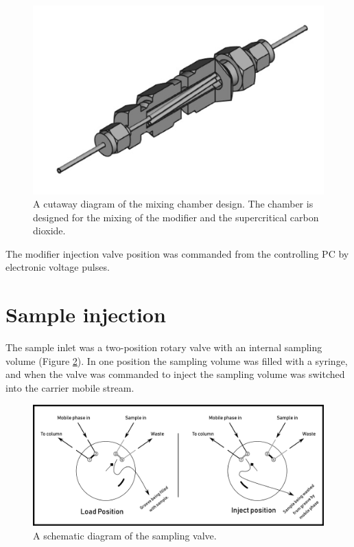 \begin{figure}
\centering
\includegraphics[width=\textwidth]{Figures/MixingChamber.png}
\decoRule

\caption[A cutaway diagram of the mixing chamber]{A cutaway diagram of the
mixing chamber design. The chamber is designed for the mixing of the modifier
and the supercritical carbon dioxide.}

\label{fig:mixingchamber}
\end{figure}

The modifier injection valve position was commanded from the controlling PC by electronic
voltage pulses.

\section{Sample injection}

The sample inlet was a two-position rotary valve with an internal sampling volume
(Figure \ref{fig:samplingvalve}). In one position the sampling volume was filled
with a syringe, and when the valve was commanded to inject the sampling volume
was switched into the carrier mobile stream.

\begin{figure}
\centering
\includegraphics[width=\textwidth]{Figures/SampleValve.pdf}
\decoRule

\caption[Schematic diagram of the injection valve.]{A schematic diagram of the sampling valve. }

\label{fig:samplingvalve}
\end{figure}

